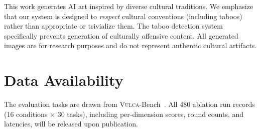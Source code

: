 \documentclass[sigconf, screen, review, anonymous]{acmart}
\newcommand{\vulca}{\textsc{Vulca}}
\begin{document}
This work generates AI art inspired by diverse cultural traditions. We emphasize that our system is designed to \emph{respect} cultural conventions (including taboos) rather than appropriate or trivialize them.
The taboo detection system specifically prevents generation of culturally offensive content.
All generated images are for research purposes and do not represent authentic cultural artifacts.

\section*{Data Availability}

The evaluation tasks are drawn from \vulca{}-Bench~\cite{yu2025vulcabench}.
All 480 ablation run records (16 conditions $\times$ 30 tasks), including per-dimension scores, round counts, and latencies, will be released upon publication.



\end{document}
